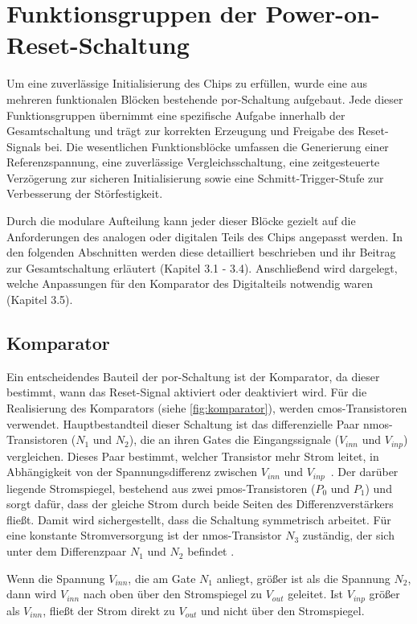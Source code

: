 \chapter{Funktionsgruppen der Power-on-Reset-Schaltung}\label{chap:Schaltung}
Um eine zuverlässige Initialisierung des Chips zu erfüllen, wurde eine aus mehreren funktionalen Blöcken bestehende \gls{por}-Schaltung aufgebaut. Jede dieser Funktionsgruppen übernimmt eine spezifische Aufgabe innerhalb der Gesamtschaltung und trägt zur korrekten Erzeugung und Freigabe des Reset-Signals bei. Die wesentlichen Funktionsblöcke umfassen die Generierung einer Referenzspannung, eine zuverlässige Vergleichsschaltung, eine zeitgesteuerte Verzögerung zur sicheren Initialisierung sowie eine Schmitt-Trigger-Stufe zur Verbesserung der Störfestigkeit. 

Durch die modulare Aufteilung kann jeder dieser Blöcke gezielt auf die Anforderungen des analogen oder digitalen Teils des Chips angepasst werden. In den folgenden Abschnitten werden diese detailliert beschrieben und ihr Beitrag zur Gesamtschaltung erläutert (Kapitel 3.1 - 3.4). Anschließend wird dargelegt, welche Anpassungen für den Komparator des Digitalteils notwendig waren (Kapitel 3.5). 


\section{Komparator}
Ein entscheidendes Bauteil der \gls{por}-Schaltung ist der Komparator, da dieser bestimmt, wann das Reset-Signal aktiviert oder deaktiviert wird. Für die Realisierung des Komparators (siehe \autoref{fig:komparator}), werden \gls{cmos}-Transistoren verwendet. Hauptbestandteil dieser Schaltung ist das differenzielle Paar \gls{nmos}-Transistoren ($N_1$ und $N_2$), die an ihren Gates die Eingangssignale ($V_{inn}$ und $V_{inp}$) vergleichen. Dieses Paar bestimmt, welcher Transistor mehr Strom leitet, in Abhängigkeit von der Spannungsdifferenz zwischen $V_{inn}$ und $V_{inp}$~\cite{DesignOfAnalogCMOSIntegratedCircuits}. Der darüber liegende Stromspiegel, bestehend aus zwei \gls{pmos}-Transistoren ($P_0$ und $P_1$) und sorgt dafür, dass der gleiche Strom durch beide Seiten des Differenzverstärkers fließt. Damit wird sichergestellt, dass die Schaltung symmetrisch arbeitet. Für eine konstante Stromversorgung ist der \gls{nmos}-Transistor $N_3$ zuständig, der sich unter dem Differenzpaar $N_1$ und $N_2$ befindet \cite{ADofIntegratedCircuits}. 

Wenn die Spannung $V_{inn}$, die am Gate $N_1$ anliegt, größer ist als die Spannung $N_2$, dann wird $V_{inn}$ nach oben über den Stromspiegel zu $V_{out}$ geleitet. Ist $V_{inp}$ größer als $V_{inn}$, fließt der Strom direkt zu $V_{out}$ und nicht über den Stromspiegel. 


